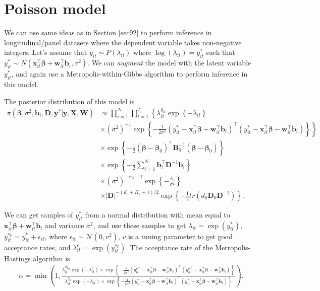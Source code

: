 \section{Poisson model}\label{sec93}

We can use same ideas as in Section \ref{sec92} to perform inference in longitudinal/panel datasets where the dependent variable takes non-negative integers. Let's assume that $y_{it}\sim P(\lambda_{it})$ where $\log(\lambda_{it})=y_{it}^*$ such that $y_{it}^*\sim N(\bm{x}_{it}^{\top}\bm{\beta}+\bm{w}_{it}^{\top}\bm{b}_i,\sigma^2)$. We can \textit{augment} the model with the latent variable $y_{it}^{*}$, and again use a Metropolis-within-Gibbs algorithm to perform inference in this model.

The posterior distribution of this model is
\begin{align*}
	\pi(\bm{\beta},\sigma^2, \bm{b}_i, \bm{D}, \bm{y}^*|\bm{y}, \bm{X}, \bm{W})&\propto \prod_{i=1}^N \prod_{t=1}^{T_i}\left\{\lambda_{it}^{y_{it}}\exp\left\{-\lambda_{it}\right\}\right.\\
	&\left.\times (\sigma^2)^{-1}\exp\left\{-\frac{1}{2\sigma^2}(y_{it}^*-\bm{x}_{it}^{\top}\bm{\beta}-\bm{w}_{it}^{\top}\bm{b}_i)^{\top}(y_{it}^*-\bm{x}_{it}^{\top}\bm{\beta}-\bm{w}_{it}^{\top}\bm{b}_i)\right\}\right\}\\
	&\times \exp\left\{-\frac{1}{2}(\bm{\beta}-\bm{\beta}_0)^{\top}\bm{B}_0^{-1}(\bm{\beta}-\bm{\beta}_0)\right\}\\
	&\times \exp\left\{-\frac{1}{2}\sum_{i=1}^N \bm{b}_i^{\top}\bm{D}^{-1}\bm{b}_i\right\}\\
	&\times (\sigma^2)^{-\alpha_0-1}\exp\left\{-\frac{\delta_0}{\sigma^2}\right\}\\
	&\times |\bm{D}|^{-(d_0+K_2+1)/2}\exp\left\{-\frac{1}{2}tr(d_0\bm{D}_0\bm{D}^{-1})\right\}.	
\end{align*}

We can get samples of $y_{it}^*$ from a normal distribution with mean equal to $\bm{x}_{it}^{\top}\bm{\beta}+\bm{w}_{it}^{\top}\bm{b}_i$ and variance $\sigma^2$, and use these samples to get $\lambda_{it}=\exp(y_{it}^*)$, $y_{it}^{*c}=y_{it}^{*}+\epsilon_{it}$, where $\epsilon_{it}\sim\mathcal{N}(0,v^2)$, $v$ is a tuning parameter to get good acceptance rates, and $\lambda_{it}^c=\exp(y_{it}^{*c})$. The acceptance rate of the Metropolis-Hastings algorithm is 
{\footnotesize
	\begin{align*}
		\alpha=\min\left(1,\frac{ \lambda_{it}^{cy_{it}}\exp(-\lambda_{it}^c)\times\exp\left\{-\frac{1}{2\sigma^2}(y_{it}^{c*}-\bm{x}_{it}^{\top}\bm{\beta}-\bm{w}_{it}^{\top}\bm{b}_i)^{\top}(y_{it}^{c*}-\bm{x}_{it}^{\top}\bm{\beta}-\bm{w}_{it}^{\top}\bm{b}_i)\right\}}{\lambda_{it}^{y_{it}}\exp(-\lambda_{it})\times\exp\left\{-\frac{1}{2\sigma^2}(y_{it}^{*}-\bm{x}_{it}^{\top}\bm{\beta}-\bm{w}_{it}^{\top}\bm{b}_i)^{\top}(y_{it}^{*}-\bm{x}_{it}^{\top}\bm{\beta}-\bm{w}_{it}^{\top}\bm{b}_i)\right\}}\right).
	\end{align*}
}

